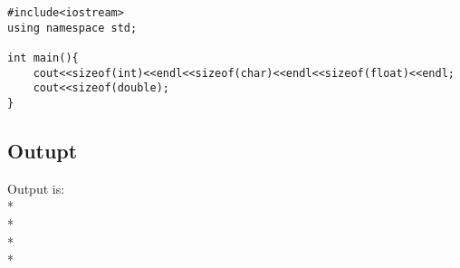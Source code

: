\begin{lstlisting}
#include<iostream>
using namespace std;

int main(){
	cout<<sizeof(int)<<endl<<sizeof(char)<<endl<<sizeof(float)<<endl;
	cout<<sizeof(double);
}
\end{lstlisting}
\subsection{Outupt}
Output is:  
\\* 
\\* 
\\* 
\\* 
